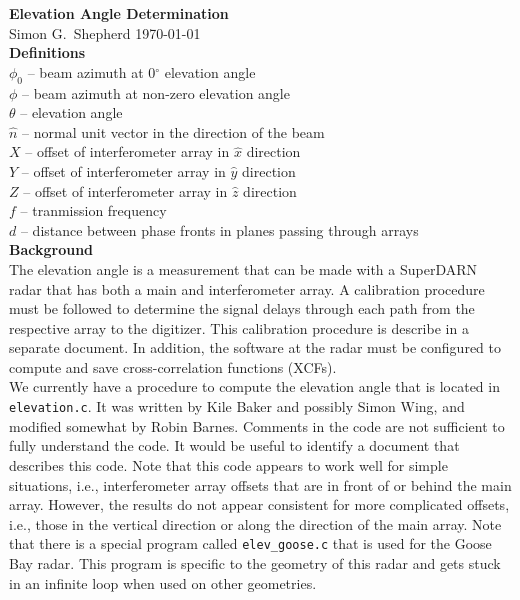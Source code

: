 \documentclass{article}
\begin{document}
\noindent
{\Large \bf Elevation Angle Determination} \\[5mm]

\noindent
Simon G.~Shepherd \hfill \today \\[5mm]

\noindent
{\large \bf Definitions} \\

\noindent
$\phi_0$ -- beam azimuth at 0$^\circ$ elevation angle \\
$\phi$ -- beam azimuth at non-zero elevation angle \\
$\theta$ -- elevation angle \\
$\hat{n}$ -- normal unit vector in the direction of the beam \\
$X$ -- offset of interferometer array in $\hat{x}$ direction \\
$Y$ -- offset of interferometer array in $\hat{y}$ direction \\
$Z$ -- offset of interferometer array in $\hat{z}$ direction \\
$f$ -- tranmission frequency \\
$d$ -- distance between phase fronts in planes passing through arrays\\[5mm]

\noindent
{\large \bf Background} \\

\noindent
The elevation angle is a measurement that can be made with a SuperDARN
radar that has both a main and interferometer array. A calibration procedure
must be followed to determine the signal delays through each path from
the respective array to the digitizer. This calibration procedure is
describe in a separate document. In addition, the software at the radar must
be configured to compute and save cross-correlation functions (XCFs). \\

\noindent
We currently have a procedure to compute the elevation angle that is located
in {\tt elevation.c}. It was written by Kile Baker and possibly Simon Wing,
and modified somewhat by Robin Barnes. Comments in the code are not sufficient
to fully understand the code. It would be useful to identify a document that
describes this code. Note that this code appears to work well for simple
situations, i.e., interferometer array offsets that are in front of or behind
the main array. However, the results do not appear consistent for more
complicated offsets, i.e., those in the vertical direction or along the
direction of the main array. Note that there is a special program called
{\tt elev\_goose.c} that is used for the Goose Bay radar. This program is
specific to the geometry of this radar and gets stuck in an infinite loop
when used on other geometries. \\
\end{document}
